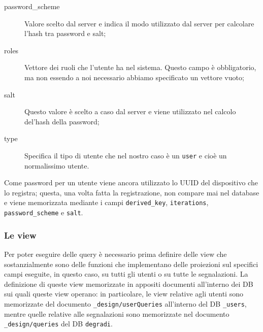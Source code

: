 \begin{description}
                    \item[password_scheme] Valore scelto dal server e indica 
                    il modo utilizzato dal server per calcolare l'hash tra 
                    password e salt;
                    \item[roles] Vettore dei ruoli che l'utente ha nel 
                    sistema. Questo campo è obbligatorio, ma non essendo a noi
                    necessario abbiamo specificato un vettore vuoto;
                    \item[salt] Questo valore è scelto a caso dal server e 
                    viene utilizzato nel calcolo del'hash della password;
                    \item[type] Specifica il tipo di utente che nel nostro 
                    caso è un \texttt{user} e cioè un normalissimo utente. 
                \end{description}
                Come password per un utente viene ancora utilizzato lo UUID 
                del dispositivo che lo registra; questa, una volta fatta la 
                registrazione, non compare mai nel database e viene 
                memorizzata mediante i campi \texttt{derived\_key}, 
                \texttt{iterations}, \texttt{password\_scheme} e \texttt{salt}.
                
            \subsubsection{Le view}
                Per poter eseguire delle query è necessario prima definire 
                delle view che sostanzialmente sono delle funzioni che 
                implementano delle proiezioni sul specifici campi eseguite, in 
                questo caso, su tutti gli utenti o su tutte le segnalazioni.
                La definizione di queste view memorizzate in appositi 
                documenti all'interno dei DB sui quali queste view operano: in 
                particolare, le view relative agli utenti sono memorizzate del 
                documento \texttt{\_design/userQueries} all'interno del DB 
                \texttt{\_users}, mentre quelle relative alle segnalazioni 
                sono memorizzate nel documento \texttt{\_design/queries} del 
                DB \texttt{degradi}.
